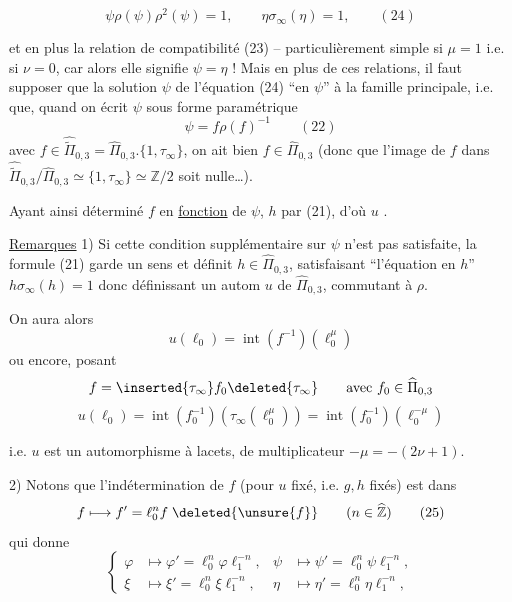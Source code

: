 

\[
\boxed{\psi\rho(\psi)\rho^2(\psi)=1,\qquad\eta\sigma_\infty(\eta)=1},
\qquad (24)
\]

et en plus la relation de compatibilité (23) -- particulièrement simple si $\mu=1$ i.e. si $\nu=0$, car alors elle signifie $\psi=\eta$ ! Mais en plus de ces relations, il faut supposer que la solution $\psi$ de l'équation (24) ``en $\psi$''  à la famille principale, i.e. que, quand on écrit $\psi$ sous forme paramétrique
\[
\psi=f\rho(f)^{-1}
\qquad (22)
\]
avec $f\in\widehat{\widetilde{\Pi}}_{0,3}=\widehat{\Pi}_{0,3}.\{1,\tau_\infty\}$, on ait bien $f\in\widehat{\Pi}_{0,3}$ (donc que l'image de $f$ dans $\widehat{\widetilde{\Pi}}_{0,3}/\widehat{\Pi}_{0,3}\simeq\{1,\tau_\infty\}\simeq\mathbb Z/2$ soit nulle\dots).

Ayant ainsi déterminé $f$ en \uline{fonction} de $\psi$,  $h$ par (21), d'où $u$ .

\uline{Remarques} 1) Si cette condition supplémentaire sur $\psi$ n'est pas satisfaite, la  formule (21) garde un sens et définit $h\in\widehat{\Pi}_{0,3}$, satisfaisant ``l'équation en $h$'' $h\sigma_\infty(h)=1$ donc définissant un autom $u$ de $\widehat{\Pi}_{0,3}$, commutant à $\rho$.

On aura alors
\[
u(\ell_0)=\operatorname{int}(f^{-1})(\ell_0^\mu)
\]
ou encore, posant
\[
f=\inserted{\tau_\infty}f_0\deleted{\tau_\infty}\qquad\text{avec }f_0\in\widehat{\Pi}_{0,3}
\]
\[
u(\ell_0)=\operatorname{int}(f_0^{-1})(\tau_\infty(\ell_0^\mu))=\operatorname{int}(f_0^{-1})(\ell_0^{-\mu})
\]



i.e. $u$ est un automorphisme à lacets, de multiplicateur $-\mu=-(2\nu+1)$.

2) Notons que l'indétermination de $f$ (pour $u$ fixé, i.e. $g,h$ fixés) est dans
\[
 f\longmapsto f'=\ell_0^n f\;\deleted{\unsure{f}}
 \qquad(n\in\widehat{\mathbb Z})
 \tag{25}
\]
qui donne
\[
 \left\{\begin{aligned}
 \varphi&\longmapsto\varphi'=\ell_0^n\varphi\ell_1^{-n},&
 \psi&\longmapsto\psi'=\ell_0^n\psi\ell_1^{-n},\\
 \xi&\longmapsto\xi'=\ell_0^n\xi\ell_1^{-n},&
 \eta&\longmapsto\eta'=\ell_0^n\eta\ell_1^{-n},
 \end{aligned}\right.
 \tag{26}
\]

